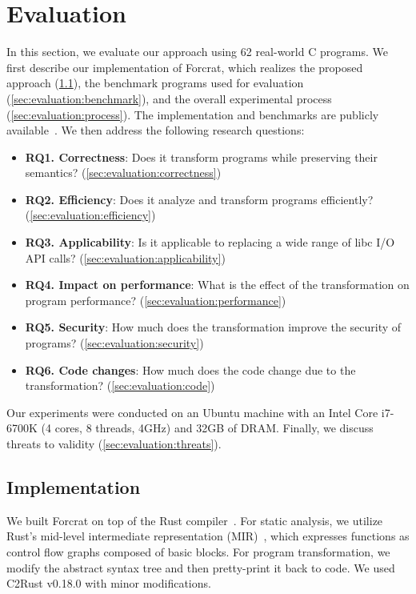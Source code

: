 \section{Evaluation}
\label{sec:evaluation}

In this section, we evaluate our approach using 62 real-world C programs.
%
We first describe our implementation of Forcrat, which realizes the proposed
approach (\cref{sec:evaluation:implementation}), the benchmark programs used
for evaluation (\cref{sec:evaluation:benchmark}), and the overall experimental
process (\cref{sec:evaluation:process}).
%
The implementation and benchmarks are publicly available~\cite{artifact}.
%
We then address the following research questions:
%
\begin{itemize}
  \item \textbf{RQ1. Correctness}: Does it transform programs while preserving their
    semantics? (\cref{sec:evaluation:correctness})
  \item \textbf{RQ2. Efficiency}: Does it analyze and transform programs efficiently?
    (\cref{sec:evaluation:efficiency})
  \item \textbf{RQ3. Applicability}: Is it applicable to replacing a wide range of libc
    I/O API calls? (\cref{sec:evaluation:applicability})
  \item \textbf{RQ4. Impact on performance}: What is the effect of the transformation on
    program performance? (\cref{sec:evaluation:performance})
  \item \textbf{RQ5. Security}: How much does the transformation improve the
    security of programs? (\cref{sec:evaluation:security})
  \item \textbf{RQ6. Code changes}: How much does the code change due to the
    transformation? (\cref{sec:evaluation:code})
\end{itemize}
%
Our experiments were conducted on an Ubuntu machine with an Intel Core i7-6700K
(4 cores, 8 threads, 4GHz) and 32GB of DRAM.
%
Finally, we discuss threats to validity (\cref{sec:evaluation:threats}).

\subsection{Implementation}
\label{sec:evaluation:implementation}

We built Forcrat on top of the Rust compiler~\cite{rustc}.
%
For static analysis, we utilize Rust's mid-level intermediate representation
(MIR)~\cite{mir}, which expresses functions as control flow graphs composed of
basic blocks.
%
For program transformation, we modify the abstract syntax tree and then
pretty-print it back to code.
%
We used C2Rust v0.18.0 with minor modifications.

